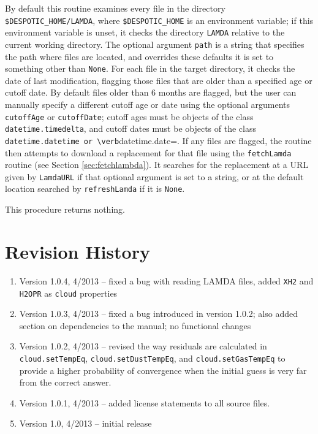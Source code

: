 \documentclass[12pt]{article}
\begin{document}
By default this routine examines every file in the directory \verb=$DESPOTIC_HOME/LAMDA=, where \verb=$DESPOTIC_HOME= is an environment variable; if this environment variable is unset, it checks the directory \verb=LAMDA= relative to the current working directory. The optional argument \verb=path= is a string that specifies the path where files are located, and overrides these defaults it is set to something other than \verb=None=. For each file in the target directory, it checks the date of last modification, flagging those files that are older than a specified age or cutoff date. By default files older than 6 months are flagged, but the user can manually specify a different cutoff age or date using the optional arguments \verb=cutoffAge= or \verb=cutoffDate=; cutoff ages must be objects of the class \verb=datetime.timedelta=, and cutoff dates must be objects of the class \verb=datetime.datetime or \verb=datetime.date=. If any files are flagged, the routine then attempts to download a replacement for that file using the \verb=fetchLamda= routine (see Section \ref{sec:fetchlambda}). It searches for the replacement at a URL given by \verb=LamdaURL= if that optional argument is set to a string, or at the default location searched by \verb=refreshLamda= if it is \verb=None=.

This procedure returns nothing.

\clearpage

\section{Revision History}

\begin{enumerate}
\item Version 1.0.4, 4/2013 -- fixed a bug with reading LAMDA files, added \verb|XH2| and \verb|H2OPR| as \verb|cloud| properties
\item Version 1.0.3, 4/2013 -- fixed a bug introduced in version 1.0.2; also added section on dependencies to the manual; no functional changes
\item Version 1.0.2, 4/2013 -- revised the way residuals are calculated in \verb=cloud.setTempEq=, \verb=cloud.setDustTempEq=, and \verb=cloud.setGasTempEq= to provide a higher probability of convergence when the initial guess is very far from the correct answer.
\item Version 1.0.1, 4/2013 -- added license statements to all source files.
\item Version 1.0, 4/2013 -- initial release
\end{enumerate}
\end{document}
